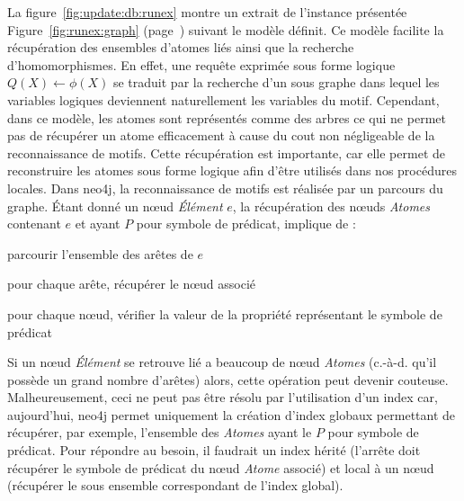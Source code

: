 La figure~\ref{fig:update:db:runex} montre un extrait de l'instance présentée Figure~\ref{fig:runex:graph} (page~\pageref{fig:runex:graph}) suivant le modèle définit.
Ce modèle facilite la récupération des ensembles d'atomes liés ainsi que la recherche d'homomorphismes.
En effet, une requête exprimée sous forme logique $Q(X) \gets \phi(X)$ se traduit par la recherche d'un sous graphe dans lequel les variables logiques deviennent naturellement les variables du motif.
Cependant, dans ce modèle, les atomes sont représentés comme des arbres ce qui ne permet pas de récupérer un atome efficacement à cause du cout non négligeable de la reconnaissance de motifs.
Cette récupération est importante, car elle permet de reconstruire les atomes sous forme logique afin d'être utilisés dans nos procédures locales.
Dans \gls{neo4j}, la reconnaissance de motifs est réalisée par un parcours du graphe.
Étant donné un nœud \textit{Élément} $e$, la récupération des nœuds \textit{Atomes} contenant $e$ et ayant $P$ pour symbole de prédicat, implique de :
\begin{enumerate*}
    \item parcourir l'ensemble des arêtes de $e$
    \item pour chaque arête, récupérer le nœud associé
    \item pour chaque nœud, vérifier la valeur de la propriété représentant le symbole de prédicat
\end{enumerate*}
Si un nœud \textit{Élément} se retrouve lié a beaucoup de nœud \textit{Atomes} (c.-à-d. qu'il possède un grand nombre d'arêtes) alors, cette opération peut devenir couteuse.
Malheureusement, ceci ne peut pas être résolu par l'utilisation d'un index car, aujourd'hui, \gls{neo4j} permet uniquement la création d'index globaux permettant de récupérer, par exemple, l'ensemble des \textit{Atomes} ayant le $P$ pour symbole de prédicat.
Pour répondre au besoin, il faudrait un index hérité (l'arrête doit récupérer le symbole de prédicat du nœud \textit{Atome} associé) et local à un nœud (récupérer le sous ensemble correspondant de l'index global).

